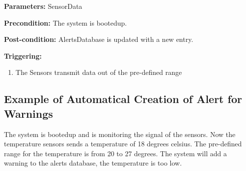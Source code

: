 \begin{description}

\item \textbf{Parameters:} SensorData
\item \textbf{Precondition:} The system is bootedup.
\item \textbf{Post-condition:} AlertsDatabase is updated with a new entry.

\item \textbf{Triggering:}
\begin{enumerate}
\item The Sensors transmit data out of the pre-defined range
\end{enumerate}
\end{description}

\subsection{Example of Automatical Creation of Alert for Warnings}
The system is bootedup and is monitoring the signal of the sensors.
Now the temperature sensors sends a temperature of 18 degrees celsius. The
pre-defined range for the temperature is from 20 to 27 degrees. The system will
add a warning to the alerts database, the temperature is too low.
